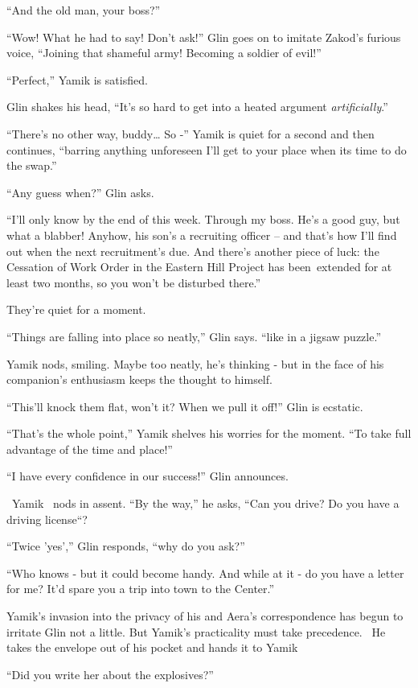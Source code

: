 \documentclass[twoside,11pt]{book}
\begin{document}
``And the old man, your boss?''

``Wow! What he had to say! Don't ask!'' Glin goes on to imitate Zakod's furious voice,
``Joining that shameful army! Becoming a soldier of evil!''

``Perfect,'' Yamik is satisfied.

Glin shakes his head, ``It's so hard to get into a heated argument \textit{artificially}.''

``There's no other way, buddy{\dots} So -'' Yamik is quiet for a second and then continues,
``barring anything unforeseen I'll get to your place when its time to do the swap.''

``Any guess when?'' Glin asks.

``I'll only know by the end of this week. Through my boss. He's a good guy, but what a blabber! Anyhow, his
son's a recruiting officer -- and that's how I'll find out when the next recruitment's due. And there's another piece
of luck: the Cessation of Work Order in the Eastern Hill Project has been~extended for at least two months, so you
won't be disturbed there.''

They're quiet for a moment.

``Things are falling into place so neatly,'' Glin says. ``like in a jigsaw
puzzle.''

Yamik nods, smiling. Maybe too neatly, he's thinking - but in the face of his companion's enthusiasm keeps the thought
to himself.

{}``This'll knock them flat, won't it? When we pull it off!'' Glin is ecstatic.

``That's the whole point,'' Yamik shelves his worries for the moment. ``To take
full advantage of the time and place!''

``I have every confidence in our success!'' Glin announces.

~Yamik \ nods in assent. ``By the way,'' he asks, ``Can you drive? Do you have a
driving license``?

``Twice 'yes','' Glin responds, ``why do you ask?''

``Who knows - but it could become handy. And while at it - do you have a letter for me? It'd spare you a
trip into town to the Center.''

Yamik's invasion into the privacy of his and Aera's correspondence has begun to irritate Glin not a little. But Yamik's
practicality must take precedence. \ He takes the envelope out of his pocket and hands it to Yamik ~

``Did you write her about the explosives?''
\end{document}
